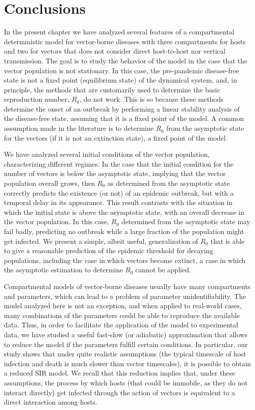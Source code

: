 \section{Conclusions}\label{sec:conclusions}

In the present chapter we have analyzed several features of a compartmental
deterministic model for vector-borne diseases with three compartments for hosts
and two for vectors that does not consider direct host-to-host nor vertical
transmission. The goal is to study the behavior of the model in the
case that the vector population is not stationary. In this case, the
pre-pandemic disease-free state is not a fixed point (equilibrium state) of the
dynamical system, and, in principle, the methods that are customarily used to
determine the basic reproduction number, $R_0$, do not work. This is so because
these methods determine the onset of an outbreak by performing a linear
stability analysis of the disease-free state, assuming that it is a fixed point
of the model. A common assumption made in the literature is to determine $R_0$
from the asymptotic state for the vectors (if it is not an extinction state), a
fixed point of the model.

We have analyzed several initial conditions of the vector population,
characterizing different regimes. In the case that the initial condition for
the number of vectors is below the asymptotic state, implying that the vector
population overall grows, then $R_0$ as determined from the asymptotic state
correctly predicts the existence (or not) of an epidemic outbreak, but with a
temporal delay in its appearance. This result contrasts with the situation in
which the initial state is above the asymptotic state, with an overall decrease
in the vector population. In this case, $R_0$ determined from the asymptotic
state may fail badly, predicting no outbreak while a large fraction of the
population might get infected. We present a simple, albeit useful,
generalization of $R_0$ that is able to give a reasonable prediction of the
epidemic threshold for decaying populations, including the case in which
vectors become extinct, a case in which the asymptotic estimation to determine
$R_0$ cannot be applied.

Compartmental models of vector-borne diseases usually have many
compartments and parameters, which can lead to a problem of parameter
unidentifiability. The model analyzed here is not an exception, and when
applied to real-world cases, many combinations of the parameters could
be able to reproduce the available data. Thus, in order to facilitate the
application of the model to experimental data, we have studied a useful
fast-slow (or adiabatic) approximation that allows to reduce the model if the
parameters fulfill certain conditions. In particular, our study shows that
under quite realistic assumptions (the typical timescale of host infection and
death is much slower than vector timescales), it is possible to obtain a
reduced SIR model. We recall that this reduction implies that, under these
assumptions, the process by which hosts (that could be immobile, as they do not
interact directly) get infected through the action of vectors is equivalent to
a direct interaction among hosts.

